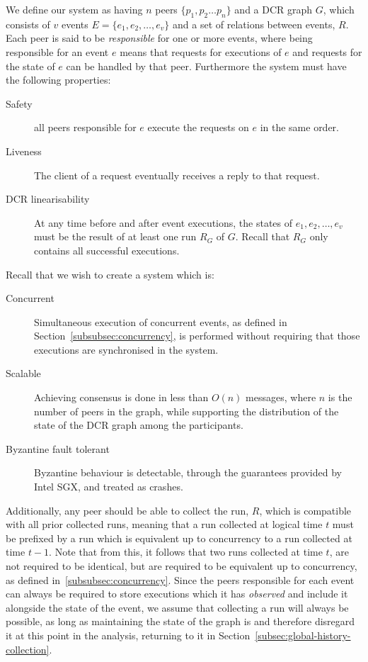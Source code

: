 \documentclass{article}
\begin{document}
	We define our system as having $n$ peers $\{p_1, p_2 \dots p_n\}$ and a DCR graph $G$, which consists of $v$ events $E = \{e_1, e_2, \dots, e_v\}$ and a set of relations between events, $R$.
	Each peer is said to be \textit{responsible} for one or more events, where being responsible for an event $e$ means that requests for executions of $e$ and requests for the state of $e$ can be handled by that peer.
	Furthermore the system must have the following properties:
	\begin{description}
		\item[Safety] all peers responsible for $e$ execute the requests on $e$ in the same order.
		\item[Liveness] The client of a request eventually receives a reply to that request.
		\item[DCR linearisability] At any time before and after event executions, the states of $e_1, e_2, \dots, e_v$ must be the result of at least one run $R_G$ of $G$. Recall that $R_G$ only contains all successful executions.
	\end{description}

    Recall that we wish to create a system which is:
    \begin{description}
        \item[Concurrent] Simultaneous execution of concurrent events, as defined in Section~\ref{subsubsec:concurrency}, is performed without requiring that those executions are synchronised in the system.
        \item[Scalable] Achieving consensus is done in less than $O(n)$ messages, where $n$ is the number of peers in the graph, while supporting the distribution of the state of the DCR graph among the participants.
        \item[Byzantine fault tolerant] Byzantine behaviour is detectable, through the guarantees provided by Intel SGX, and treated as crashes.
    \end{description}

	 Additionally, any peer should be able to collect the run, $R$, which is compatible with all prior collected runs, meaning that a run collected at logical time $t$ must be prefixed by a run which is equivalent up to concurrency to a run collected at time $t-1$.
     Note that from this, it follows that two runs collected at time $t$, are not required to be identical, but are required to be equivalent up to concurrency, as defined in~\ref{subsubsec:concurrency}.
     Since the peers responsible for each event can always be required to store executions which it has \textit{observed} and include it alongside the state of the event, we assume that collecting a run will always be possible, as long as maintaining the state of the graph is and therefore disregard it at this point in the analysis, returning to it in Section~\ref{subsec:global-history-collection}.
\end{document}
